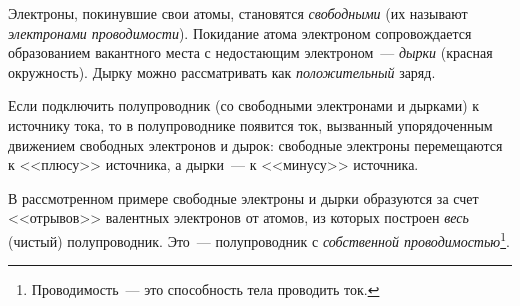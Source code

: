 \documentclass[main.tex]{subfiles}
\begin{document}
Электроны, покинувшие свои атомы, становятся \emph{свободными} (их называют \emph{электронами проводимости}). Покидание атома электроном сопровождается образованием вакантного места с недостающим электроном~--- \emph{дырки} (красная окружность). Дырку можно рассматривать как \emph{положительный} заряд.


Если подключить полупроводник (со свободными электронами и дырками) к источнику тока, то в полупроводнике появится ток, вызванный упорядоченным движением свободных электронов и дырок: свободные электроны перемещаются к <<плюсу>> источника, а дырки~--- к <<минусу>> источника.

В рассмотренном примере свободные электроны и дырки образуются за счет <<отрывов>> валентных электронов от атомов, из которых построен \emph{весь} (чистый) полупроводник.
Это~--- полупроводник с \emph{собственной проводимостью}\footnote{Проводимость~--- это способность тела проводить ток.}.


















 
\end{document}
